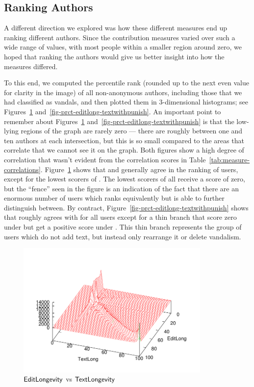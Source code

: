 \subsection{Ranking Authors}

A different direction we explored was how these different
measures end up ranking different authors.
Since the contribution measures varied over such a
wide range of values, with most people within
a smaller region around zero, we hoped that
ranking the authors would give us better insight into how
the measures differed.

To this end,  we computed the percentile rank
(rounded up to the next even value for clarity in the image)
of all non-anonymous authors, including those
that we had classified as vandals, and then plotted
them in 3-dimensional histograms; see
Figures~\ref{fig-prct-editlong-textlong}
and~\ref{fig-prct-editlong-textwithpunish}.
An important point to remember about
Figures~\ref{fig-prct-editlong-textlong}
and~\ref{fig-prct-editlong-textwithpunish}
is that the low-lying regions of the graph are
rarely zero --- there are roughly between one and ten
authors at each intersection, but this is so small compared
to the areas that correlate that we cannot see it on the graph.
Both figures show a high degree of correlation that wasn't evident
from the correlation scores in Table~\ref{tab:measure-correlations}.
Figure~\ref{fig-prct-editlong-textlong} shows that \textlong and
\editlong generally agree in the ranking of users, except for the lowest
scorers of \textlong.
The lowest scorers of \textlong all receive a score of zero, but the
``fence'' seen in the figure is an indication of the fact that there are
an enormous number of users which \textlong ranks equivalently but
\editlong is able to further distinguish between.
By contract, Figure~\ref{fig-prct-editlong-textwithpunish} shows that
\punish roughly agrees with \editlong for all users except for a thin
branch that score zero under \punish but get a positive score under
\editlong.
This thin branch represents the group of users which do not add text,
but instead only rearrange it or delete vandalism.
%
\begin{figure}[tbhp]
    \begin{center}
    \includegraphics[width=0.85\textwidth]{part-I10-contrib/graphs/prct-editlong-textlong}
    \end{center}
    \caption[Comparing edit longevity with text longevity]{
    	$\editlong$ vs $\textlong$
    }
    \label{fig-prct-editlong-textlong}
\end{figure}

